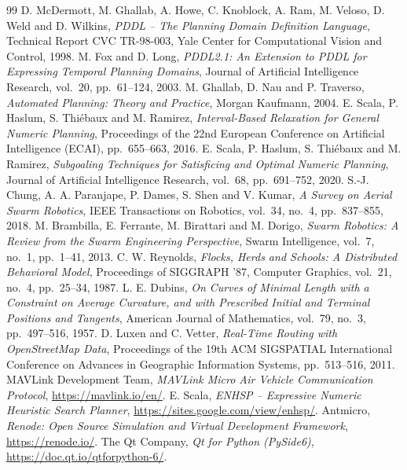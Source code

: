 \documentclass[11pt,a4paper,oneside]{report}
\begin{document}
\clearpage
{}
{}
\renewcommand{\bibname}{References}
\begin{thebibliography}{99}
\setlength{\itemsep}{3pt}
 D. McDermott, M. Ghallab, A. Howe, C. Knoblock, A. Ram, M. Veloso,
  D. Weld and D. Wilkins, \emph{PDDL -- The Planning Domain Definition Language}, Technical Report
  CVC TR-98-003, Yale Center for Computational Vision and Control, 1998.
 M. Fox and D. Long, \emph{PDDL2.1: An Extension to PDDL for Expressing
  Temporal Planning Domains}, Journal of Artificial Intelligence Research, vol.~20, pp.~61--124,
  2003.
 M. Ghallab, D. Nau and P. Traverso, \emph{Automated Planning:
  Theory and Practice}, Morgan Kaufmann, 2004.
 E. Scala, P. Haslum, S. Thi\'ebaux and M. Ramirez,
  \emph{Interval-Based Relaxation for General Numeric Planning}, Proceedings of the 22nd European
  Conference on Artificial Intelligence (ECAI), pp.~655--663, 2016.
 E. Scala, P. Haslum, S. Thi\'ebaux and M. Ramirez,
  \emph{Subgoaling Techniques for Satisficing and Optimal Numeric Planning}, Journal of Artificial
  Intelligence Research, vol.~68, pp.~691--752, 2020.
 S.-J. Chung, A. A. Paranjape, P. Dames, S. Shen and V. Kumar,
  \emph{A Survey on Aerial Swarm Robotics}, IEEE Transactions on Robotics, vol.~34, no.~4,
  pp.~837--855, 2018.
 M. Brambilla, E. Ferrante, M. Birattari and M. Dorigo,
  \emph{Swarm Robotics: A Review from the Swarm Engineering Perspective}, Swarm Intelligence,
  vol.~7, no.~1, pp.~1--41, 2013.
 C. W. Reynolds, \emph{Flocks, Herds and Schools: A Distributed
  Behavioral Model}, Proceedings of SIGGRAPH '87, Computer Graphics, vol.~21, no.~4, pp.~25--34,
  1987.
 L. E. Dubins, \emph{On Curves of Minimal Length with a Constraint on
  Average Curvature, and with Prescribed Initial and Terminal Positions and Tangents}, American
  Journal of Mathematics, vol.~79, no.~3, pp.~497--516, 1957.
 D. Luxen and C. Vetter, \emph{Real-Time Routing with OpenStreetMap Data},
  Proceedings of the 19th ACM SIGSPATIAL International Conference on Advances in Geographic
  Information Systems, pp.~513--516, 2011.
 MAVLink Development Team, \emph{MAVLink Micro Air Vehicle Communication
  Protocol}, \url{https://mavlink.io/en/}.
 E. Scala, \emph{ENHSP -- Expressive Numeric Heuristic Search Planner},
  \url{https://sites.google.com/view/enhsp/}.
 Antmicro, \emph{Renode: Open Source Simulation and Virtual Development
  Framework}, \url{https://renode.io/}.
 The Qt Company, \emph{Qt for Python (PySide6)},
  \url{https://doc.qt.io/qtforpython-6/}.
\end{thebibliography}
\end{document}
